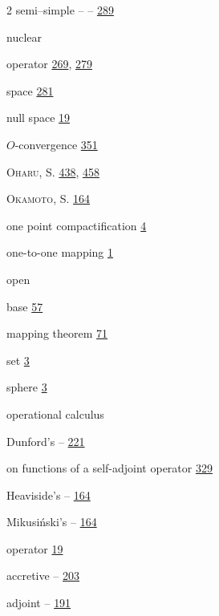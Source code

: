 \begin{multicols}{2}
\hspace*{2.2em}semi--simple -- -- \hyperlink{page.289}{289}\par
\noindent nuclear\par
\hspace*{1.1em}operator \hyperlink{page.269}{269}, \hyperlink{page.279}{279}\par
\hspace*{1.1em}space \hyperlink{page.281}{281}\par
\noindent null space \hyperlink{page.19}{19}\par
\noindent $O$-convergence \hyperlink{page.351}{351}\par
\noindent \textsc{Oharu}, S. \hyperlink{page.438}{438}, \hyperlink{page.458}{458}\par
\noindent \textsc{Okamoto}, S. \hyperlink{page.164}{164}\par
\noindent one point compactification \hyperlink{page.4}{4}\par
\noindent one-to-one mapping \hyperlink{page.1}{1}\par
\noindent open\par
\hspace*{1.1em}base \hyperlink{page.57}{57}\par
\hspace*{1.1em}mapping theorem \hyperlink{page.71}{71}\par
\hspace*{1.1em}set \hyperlink{page.3}{3}\par
\hspace*{1.1em}sphere \hyperlink{page.3}{3}\par
\noindent operational calculus\par
\hspace*{1.1em}Dunford's -- \hyperlink{page.221}{221}\par
\hspace*{1.1em}on functions of a self-adjoint operator \hyperlink{page.329}{329}\par
\hspace*{1.1em}Heaviside's -- \hyperlink{page.164}{164}\par
\hspace*{1.1em}Mikusiński's -- \hyperlink{page.164}{164}\par
\noindent operator \hyperlink{page.19}{19}\par
\hspace*{1.1em}accretive -- \hyperlink{page.203}{203}\par
\hspace*{1.1em}adjoint -- \hyperlink{page.191}{191}\par

\end{multicols}
